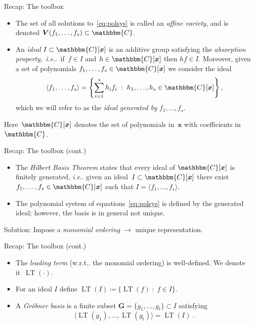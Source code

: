 \documentclass[aspectratio=169]{beamer}
\makeatletter
\newcommand{\C}{\ensuremath{\mathbbm{C}}}
\newcommand{\mat}[1]{\bm{#1}}
\DeclareRobustCommand\ie{\emph{i.e}\@ifnextchar.{}{.\@}}
\DeclareRobustCommand\wrt{w.r.t\@ifnextchar.{}{.\@}}
\DeclareMathOperator{\lt}{LT}
\makeatother
\begin{document}
\begin{frame}{Recap: The toolbox}
\begin{itemize}
\item  The set of all solutions to~\eqref{eq:polsys} is called an \emph{affine variety}, and is denoted
$\mat{V}(f_1,\ldots,f_s)\subset\C$.
\item An \emph{ideal} $I\subset\C[\mat{x}]$ is an additive group satisfying the \emph{absorption property},~\ie{}~if~$f\in I$ and $h\in\C[\mat{x}]$ then $hf\in I$. Moreover, given a set of polynomials $f_1,\ldots,f_s\in\C[\mat{x}]$
we consider the ideal
\begin{equation*}
\langle f_1,\ldots,f_s\rangle = \left\{\sum_{i=1}^sh_if_i\;:\;h_1,\ldots,h_s\in\C[\mat{x}]\right\},
\end{equation*}
which we will refer to as the \emph{ideal generated by} $f_1,\ldots,f_s$.

\end{itemize}
Here~$\C[\mat{x}]$ denotes the set
of polynomials in~$\mat{x}$ with coefficients in $\C$.
\end{frame}


\begin{frame}{Recap: The toolbox (cont.)}

\begin{itemize}
\item The \emph{Hilbert Basis Theorem} states that every ideal of $\C[\mat{x}]$ is
finitely generated, \ie{} given an ideal~$I\subset\C[\mat{x}]$ there exist
$f_1,\ldots,f_s\in\C[\mat{x}]$ such that $I=\langle f_1,\ldots,f_s\rangle$.
\item The polynomial system of equations~\eqref{eq:polsys} is defined by the
generated ideal; however, the basis is in general not unique.
\end{itemize}

\alert{Solution}: Impose a \emph{monomial ordering} $\longrightarrow$ unique representation.
\end{frame}

\begin{frame}{Recap: The toolbox (cont.)}

\begin{itemize}
\item The \emph{leading term} (\wrt{} the monomial ordering) is well-defined. We denote it~$\lt(\cdot)$.
\item For an ideal $I$ define $\lt(I)\coloneqq\{\lt(f)\;:\;f\in I\}$.
\item A \emph{Gröbner basis} is a finite subset \mbox{$\mat{G}=\{g_1,\ldots,g_t\}\subset I$}
satisfying
\begin{equation*}
    \langle\lt(g_1),\ldots,\lt(g_t)\rangle=\lt(I)\;.
\end{equation*}
\end{itemize}
\end{frame}
\end{document}
